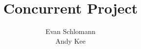 \documentclass{article}
\begin{document}
\title{Concurrent Project}
\author{Evan Schlomann \\ Andy Kee}

\maketitle
\vfill

\pagebreak



\vspace{.5in}



\vspace{.5in}



\vspace{.5in}



\vspace{.5in}
\end{document}
